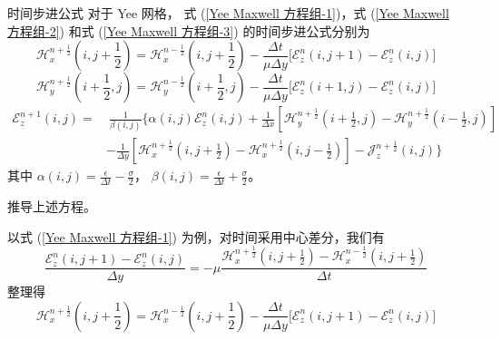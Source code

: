 \begin{theorem}{时间步进公式}
    对于 Yee 网格，
    式 (\ref{Yee Maxwell 方程组-1})，式 (\ref{Yee Maxwell 方程组-2}) 
    和式 (\ref{Yee Maxwell 方程组-3})
    的时间步进公式分别为
    \begin{equation}
        \mathscr{H}_x^{n+\frac{1}{2}}\left(i,j+\frac{1}{2}\right)=
        \mathscr{H}_x^{n-\frac{1}{2}}\left(i,j+\frac{1}{2}\right)
        -\frac{\Delta t}{\mu \Delta y}\Big[
        \mathscr{E}_z^n(i,j+1)-\mathscr{E}_z^n(i,j)
        \Big]
        \label{Yee 时间步进公式-1}
    \end{equation}
    \begin{equation}
        \mathscr{H}_y^{n+\frac{1}{2}}\left(i+\frac{1}{2},j\right)=
        \mathscr{H}_y^{n-\frac{1}{2}}\left(i+\frac{1}{2},j\right)
        -\frac{\Delta t}{\mu \Delta y}\Big[
        \mathscr{E}_z^n(i+1,j)-\mathscr{E}_z^n(i,j)
        \Big]
        \label{Yee 时间步进公式-2}
    \end{equation}
    \begin{equation}
        \begin{aligned}
            \mathscr{E}_z^{n+1}(i,j)=&\ \frac{1}{\beta(i,j)}
            \Bigg\{\alpha(i,j)\mathscr{E}_z^n(i,j)+\frac{1}{\Delta x}\left[
                \mathscr{H}_y^{n+\frac{1}{2}}\left(i+\frac{1}{2},j\right)
                -\mathscr{H}_y^{n+\frac{1}{2}}\left(i-\frac{1}{2},j\right)
            \right]\\
            &-\frac{1}{\Delta y}
            \left[\mathscr{H}_x^{n+\frac{1}{2}}\left(i,j+\frac{1}{2}\right)
            -\mathscr{H}_x^{n+\frac{1}{2}}\left(i,j-\frac{1}{2}\right)
            \right]-\mathscr{J}_z^{n+\frac{1}{2}}(i,j)
            \Bigg\}
        \end{aligned}
        \label{Yee 时间步进公式-3}
    \end{equation}
    其中 $\alpha(i,j)=\frac{\epsilon}{\Delta t}-\frac{\sigma}{2}$，
    $\beta(i,j)=\frac{\epsilon}{\Delta t}+\frac{\sigma}{2}$。
\end{theorem}

\begin{exercise}
    推导上述方程。
\end{exercise}

\begin{solution}
    以式 (\ref{Yee Maxwell 方程组-1}) 为例，对时间采用中心差分，我们有
    \begin{equation*}
        \frac{\mathscr{E}_z^n(i,j+1)-\mathscr{E}_z^n(i,j)}{\Delta y}
        =-\mu \frac{\mathscr{H}_x^{n+\frac{1}{2}}\left(i,j+\frac{1}{2}\right)
        -\mathscr{H}_x^{n-\frac{1}{2}}\left(i,j+\frac{1}{2}\right)}{\Delta t}
    \end{equation*}
    整理得
    \begin{equation*}
        \mathscr{H}_x^{n+\frac{1}{2}}\left(i,j+\frac{1}{2}\right)=
        \mathscr{H}_x^{n-\frac{1}{2}}\left(i,j+\frac{1}{2}\right)
        -\frac{\Delta t}{\mu \Delta y}\Big[
        \mathscr{E}_z^n(i,j+1)-\mathscr{E}_z^n(i,j)
        \Big]
    \end{equation*}
\end{solution}

